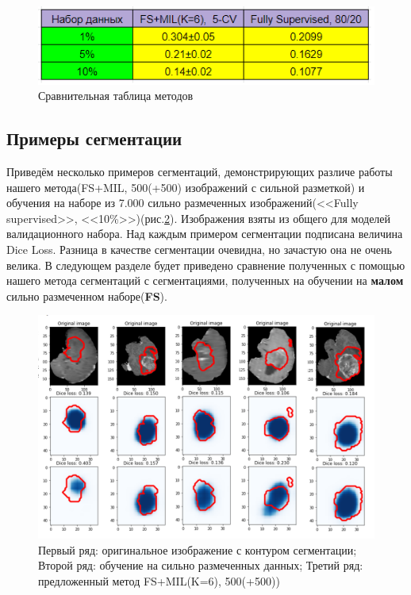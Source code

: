\begin{figure}[h!] 
  \center
  \includegraphics [scale=1.0] {images/compare_with_fs.png}
  \caption{Сравнительная таблица методов}
  \label{fig:cmp_with_fs}  
\end{figure}
\newpage
\subsection{Примеры сегментации}

Приведём несколько примеров сегментаций, демонстрирующих различе работы нашего метода(FS+MIL, 500(+500) изображений с сильной разметкой) и обучения на наборе из 7.000 сильно размеченных изображений(<<Fully supervised>>, <<10\%>>)(рис.\ref{fig:cmp_fs_ours}).   Изображения взяты из общего для моделей валидационного набора. Над каждым примером сегментации подписана величина Dice Loss. Разница в качестве сегментации очевидна, но зачастую она не очень велика. В следующем разделе будет приведено сравнение полученных с помощью нашего метода сегментаций с сегментациями, полученных на обучении на {\bf малом} сильно размеченном наборе({\bf FS}). 

\begin{figure}[h!] 
  \center
  \includegraphics [scale=0.65] {images/cmp_fs_ours.png}
  \caption{Первый ряд: оригинальное изображение с контуром сегментации; Второй ряд: обучение на сильно размеченных данных; Третий ряд: предложенный метод FS+MIL(K=6), 500(+500))}
  \label{fig:cmp_fs_ours}  
\end{figure}




